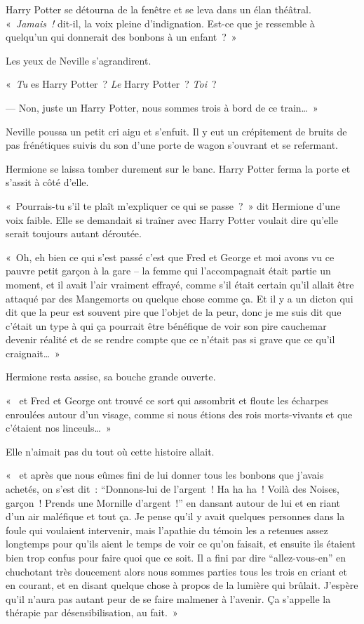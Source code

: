 Harry Potter se détourna de la fenêtre et se leva dans un élan théâtral. «~\emph{Jamais~!} dit-il, la voix pleine d'indignation. Est-ce que je ressemble à quelqu'un qui donnerait des bonbons à un enfant~?~»

Les yeux de Neville s'agrandirent.

«~\emph{Tu} es Harry Potter~? \emph{Le} Harry Potter~? \emph{Toi}~?

--- Non, juste un Harry Potter, nous sommes trois à bord de ce train…~»

Neville poussa un petit cri aigu et s'enfuit. Il y eut un crépitement de bruits de pas frénétiques suivis du son d'une porte de wagon s'ouvrant et se refermant.

Hermione se laissa tomber durement sur le banc. Harry Potter ferma la porte et s'assit à côté d'elle.

«~Pourrais-tu s'il te plaît m'expliquer ce qui se passe~?~» dit Hermione d'une voix faible. Elle se demandait si traîner avec Harry Potter voulait dire qu'elle serait toujours autant déroutée.

«~Oh, eh bien ce qui s'est passé c'est que Fred et George et moi avons vu ce pauvre petit garçon à la gare -- la femme qui l'accompagnait était partie un moment, et il avait l'air vraiment effrayé, comme s'il était certain qu'il allait être attaqué par des Mangemorts ou quelque chose comme ça. Et il y a un dicton qui dit que la peur est souvent pire que l'objet de la peur, donc je me suis dit que c'était un type à qui ça pourrait être bénéfique de voir son pire cauchemar devenir réalité et de se rendre compte que ce n'était pas si grave que ce qu'il craignait…~»

Hermione resta assise, sa bouche grande ouverte.

«~ et Fred et George ont trouvé ce sort qui assombrit et floute les écharpes enroulées autour d'un visage, comme si nous étions des rois morts-vivants et que c'étaient nos linceuls…~»

Elle n'aimait pas du tout où cette histoire allait.

«~ et après que nous eûmes fini de lui donner tous les bonbons que j'avais achetés, on s'est dit~: “Donnons-lui de l'argent~! Ha ha ha~! Voilà des Noises, garçon~! Prends une Mornille d'argent~!” en dansant autour de lui et en riant d'un air maléfique et tout ça. Je pense qu'il y avait quelques personnes dans la foule qui voulaient intervenir, mais l'apathie du témoin les a retenues assez longtemps pour qu'ils aient le temps de voir ce qu'on faisait, et ensuite ils étaient bien trop confus pour faire quoi que ce soit. Il a fini par dire “allez-vous-en” en chuchotant très doucement alors nous sommes parties tous les trois en criant et en courant, et en disant quelque chose à propos de la lumière qui brûlait. J'espère qu'il n'aura pas autant peur de se faire malmener à l'avenir. Ça s'appelle la thérapie par désensibilisation, au fait.~»

